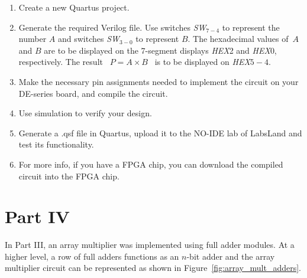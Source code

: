 \documentclass[epsfig,10pt,fullpage]{article}
\begin{document}
\begin{enumerate}
\item Create a new Quartus project.
\item Generate the required Verilog file. Use switches {\it SW}$_{7-4}$ to represent the 
number $A$ and switches {\it SW}$_{3-0}$ to represent $B$. The hexadecimal values of~$A$ 
and $B$ are to be displayed on the 7-segment displays {\it HEX}2 and {\it HEX}0, respectively.
The result ~$P = A \times B$~ is to be displayed on {\it HEX}$5-4$.
\item Make the necessary pin assignments needed to implement the circuit on your
DE-series board, and compile the circuit.
\item Use simulation to verify your design.
\item Generate a .qsf file in Quartus, upload it to the NO-IDE lab of LabsLand and test its functionality.
\item For more info, if you have a FPGA chip, you can download the compiled circuit into the FPGA chip.
\end{enumerate}

\section*{Part IV}
In Part III, an array multiplier was implemented using full adder modules. At a higher level, a row of full adders functions as an $n$-bit adder and the array multiplier circuit can be represented as shown in Figure~\ref{fig:array_mult_adders}.
\end{document}
